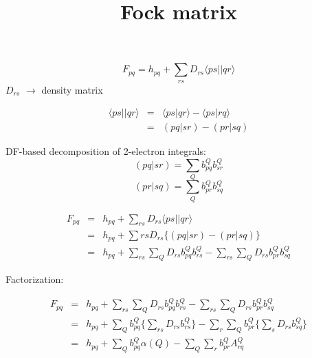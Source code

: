 \documentclass[aps,pra,groupedaddress]{revtex4-1}
\begin{document}
\title{Fock matrix}


\begin{equation}
F_{pq}=h_{pq}+\sum_{rs} D_{rs}\langle ps || qr \rangle
\end{equation}
$D_{rs}$ $\rightarrow$ density matrix

\begin{eqnarray}
\langle ps || qr \rangle &=& \langle ps|qr\rangle - \langle ps|rq\rangle  \\
                                   &=& (pq|sr)-(pr|sq) 
\end{eqnarray}


\noindent DF-based decomposition of 2-electron integrals:
\begin{equation}
(pq|sr)=\sum_Q b_{pq}^Q b_{sr}^Q
\end{equation}
\begin{equation}
(pr|sq)=\sum_Q b_{pr}^Q b_{sq}^Q
\end{equation}


\begin{eqnarray}
F_{pq} &=& h_{pq}+\sum_{rs} D_{rs} \langle ps||qr\rangle  \\
&=& h_{pq}+\sum{rs} D_{rs} \lbrace (pq|sr)-(pr|sq) \rbrace \\
&=& h_{pq} + \sum_{rs}\sum_Q D_{rs} b_{pq}^Q b_{rs}^Q -\sum_{rs}\sum_Q D_{rs} b_{pr}^Q b_{sq}^Q 
\end{eqnarray}


\noindent Factorization: 

\begin{eqnarray}
F_{pq}  &=& h_{pq} + \sum_{rs}\sum_Q D_{rs} b_{pq}^Q b_{rs}^Q -\sum_{rs}\sum_Q D_{rs} b_{pr}^Q b_{sq}^Q  \\
&=& h_{pq}+ \sum_Q b_{pq}^Q \lbrace  \sum_{rs} D_{rs}  b_{rs}^Q \rbrace  - \sum_r \sum_Q b_{pr}^Q \lbrace  \sum_s D_{rs} b_{sq}^Q  \rbrace  \\
&=& h_{pq} + \sum_Q b_{pq}^Q \alpha(Q) -  \sum_Q \sum_r b_{pr}^Q A_{rq}^Q 
\end{eqnarray}

\newpage
\end{document}
